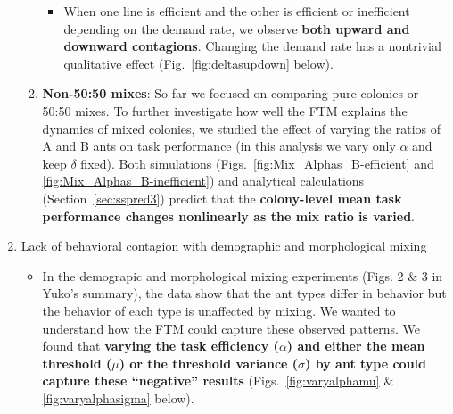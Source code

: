 \documentclass[11pt]{article}
\begin{document}
\begin{enumerate}
\begin{enumerate}
\begin{itemize}
        \item When one line is efficient and the other is efficient or inefficient depending on the demand rate, we observe \textbf{both upward and downward contagions}. Changing the demand rate has a nontrivial qualitative effect (Fig.~\ref{fig:deltasupdown} below).
        
    \end{itemize}
    \vspace{5pt}
    
    \item \textbf{Non-50:50 mixes}: So far we focused on comparing pure colonies or 50:50 mixes. To further investigate how well the FTM explains the dynamics of mixed colonies, we studied the effect of varying the ratios of A and B ants on task performance (in this analysis we vary only $\alpha$ and keep $\delta$ fixed).
    Both simulations (Figs.~\ref{fig:Mix_Alphas_B-efficient} and \ref{fig:Mix_Alphas_B-inefficient}) and analytical calculations (Section~\ref{sec:sspred3}) predict that the \textbf{colony-level mean task performance changes nonlinearly as the mix ratio is varied}.
    
    \end{enumerate}
    
    \item Lack of behavioral contagion with demographic and morphological mixing
    \begin{itemize}
        \item In the demograpic and morphological mixing experiments (Figs. 2 \& 3 in Yuko's summary), the data show that the ant types differ in behavior but the behavior of each type is unaffected by mixing. We wanted to understand how the FTM could capture these observed patterns. We found that \textbf{varying the task efficiency ($\alpha$) and either the mean threshold ($\mu$) or the threshold variance ($\sigma$) by ant type could capture these ``negative'' results} (Figs.~\ref{fig:varyalphamu} \& \ref{fig:varyalphasigma} below).
    \end{itemize}

\end{enumerate}
\end{document}
